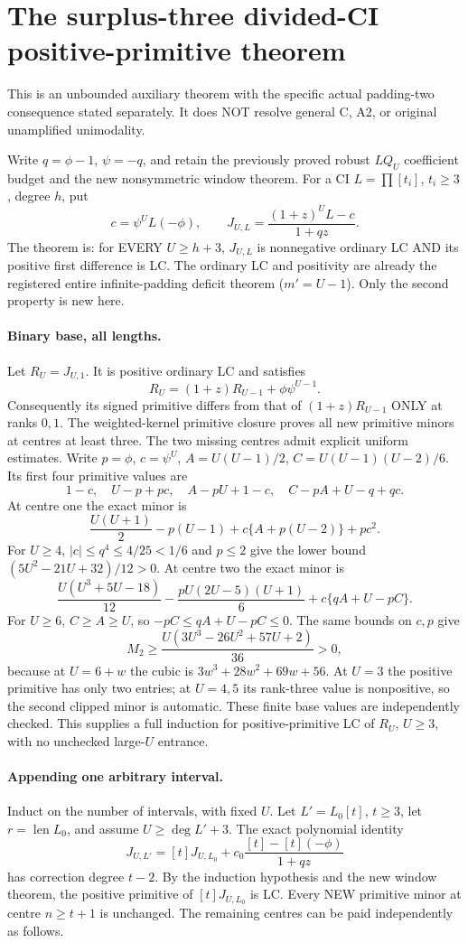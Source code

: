\section{The surplus-three divided-CI positive-primitive theorem}
This is an unbounded auxiliary theorem with the specific actual
padding-two consequence stated separately. It does NOT resolve general
C, A2, or original unamplified unimodality.

Write $q=\phi-1$, $\psi=-q$, and retain the previously proved robust
$LQ_U$ coefficient budget and the new nonsymmetric window theorem.
For a CI $L=\prod[t_i]$, $t_i\ge3$, degree $h$, put
\[
 c=\psi^U L(-\phi),\qquad
 J_{U,L}=\frac{(1+z)^UL-c}{1+qz}.
\]
The theorem is: for EVERY $U\ge h+3$, $J_{U,L}$ is
nonnegative ordinary LC AND its positive first difference is LC.
The ordinary LC and positivity are already the registered entire
infinite-padding deficit theorem ($m'=U-1$). Only the second property
is new here.

\paragraph{Binary base, all lengths.}
Let $R_U=J_{U,1}$. It is positive ordinary LC and satisfies
\[
 R_U=(1+z)R_{U-1}+\phi\psi^{U-1}.
\]
Consequently its signed primitive differs from that of
$(1+z)R_{U-1}$ ONLY at ranks $0,1$. The weighted-kernel primitive
closure proves all new primitive minors at centres at least three.
The two missing centres admit explicit uniform estimates.
Write $p=\phi$, $c=\psi^U$, $A=U(U-1)/2$, $C=U(U-1)(U-2)/6$.
Its first four primitive values are
\[
 1-c,\quad U-p+pc,\quad A-pU+1-c,\quad C-pA+U-q+qc.
\]
At centre one the exact minor is
\[
 \frac{U(U+1)}2-p(U-1)
       +c\{A+p(U-2)\}+pc^2.
\]
For $U\ge4$, $|c|\le q^4\le4/25<1/6$ and $p\le2$ give the
lower bound $(5U^2-21U+32)/12>0$.
At centre two the exact minor is
\[
 \frac{U(U^3+5U-18)}{12}
 -\frac{pU(2U-5)(U+1)}6
       +c\{qA+U-pC\}.
\]
For $U\ge6$, $C\ge A\ge U$, so
$-pC\le qA+U-pC\le0$. The same bounds on $c,p$ give
\[
 M_2\ge\frac{U(3U^3-26U^2+57U+2)}{36}>0,
\]
because at $U=6+w$ the cubic is
$3w^3+28w^2+69w+56$.
At $U=3$ the positive primitive has only two entries; at $U=4,5$
its rank-three value is nonpositive, so the second clipped minor
is automatic. These finite base values are independently checked.
This supplies a full induction for positive-primitive LC of $R_U$,
$U\ge3$, with no unchecked large-$U$ entrance.

\paragraph{Appending one arbitrary interval.}
Induct on the number of intervals, with fixed $U$.
Let $L'=L_0[t]$, $t\ge3$, let $r=\operatorname{len}L_0$, and
assume $U\ge\deg L'+3$. The exact polynomial identity
\[
 J_{U,L'}=[t]J_{U,L_0}+c_0\frac{[t]-[t](-\phi)}{1+qz}
\]
has correction degree $t-2$. By the induction hypothesis and the
new window theorem, the positive primitive of $[t]J_{U,L_0}$
is LC. Every NEW primitive minor at centre $n\ge t+1$ is
unchanged. The remaining centres can be paid independently as follows.

